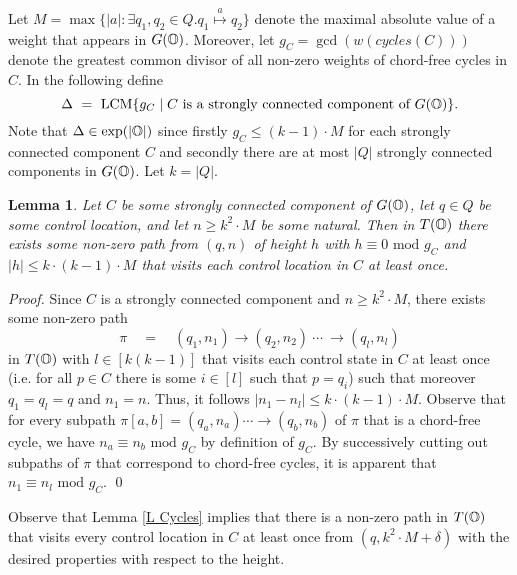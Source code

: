 \documentclass[times,envcountsame]{llncs}
\newtheorem{lemma}[theorem]{{\bf Lemma}}
\newcommand{\LCM}{\text{LCM}}
\begin{document}
Let $M=\max\{|a|:\exists q_1,q_2\in Q. q_1\stackrel{a}{\mapsto}q_2\}$
denote the maximal absolute value of a weight that appears in $G(\mathbb{O})$.
Moreover, let $g_C=\gcd(w(cycles(C)))$ denote the greatest common divisor
of all non-zero weights of chord-free cycles in $C$.
In the following define $$\Delta\ =\ \LCM\{g_C\mid C\text{ is a strongly
connected component of } G(\O)\}.$$
\noindent
Note that $\Delta\in\exp(|\mathbb{O}|)$ since firstly $g_C\leq (k-1)\cdot M$ for each strongly
connected component $C$ and secondly there are at most $|Q|$
strongly connected components in $G(\mathbb{O})$.
Let $k=|Q|$.


\begin{lemma}{\label{L Cycles}}
Let $C$ be some strongly connected component of $G(\mathbb{O})$, let $q\in Q$ be some
control location, and let $n\geq k^2\cdot M$ be some natural.
Then in $T(\mathbb{O})$ there exists some non-zero path from $(q,n)$ of height $h$ with $h\equiv
0\text{ mod }g_C$ and $|h|\leq k\cdot(k-1)\cdot M$  that visits each
control location in $C$ at least once.
\end{lemma}
\begin{proof}
Since $C$ is a strongly connected component and $n\geq k^2\cdot M$, there exists some
non-zero path
$$
\pi\quad =\quad(q_1,n_1)\rightarrow(q_2,n_2)\ \cdots\ \rightarrow (q_l,n_l)
$$
in $T(\mathbb{O})$ with $l\in[k(k-1)]$ that visits each control state in $C$ at least once
(i.e. for all $p\in C$ there is some $i\in[l]$ such that $p=q_i$) such that
moreover $q_1=q_l=q$ and $n_1=n$. Thus, it follows $|n_1-n_l|\leq k\cdot
(k-1)\cdot M$.
Observe that for every subpath $\pi[a,b]=(q_a,n_a)\cdots\rightarrow(q_b,n_b)$ of $\pi$ that is a chord-free
cycle, we have $n_a\equiv n_b\text{ mod } g_C$ by definition of $g_C$.
By successively cutting out subpaths of $\pi$ that correspond to chord-free
cycles, it is apparent that $n_1\equiv n_l\text{ mod }g_C$.
\qed
\end{proof}

Observe that Lemma \ref{L Cycles} implies that there is a non-zero path in
$T(\mathbb{O})$ that visits every
control location in $C$ at least once from $(q,k^2\cdot M+\delta)$ with the
desired properties with respect to the height.
\end{document}

